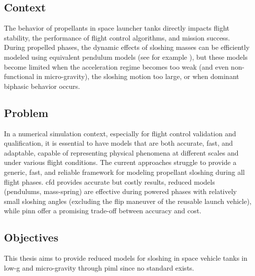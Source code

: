 \documentclass[12pt]{article}
\begin{document}
	\subsection*{Context}
	
	The behavior of propellants in space launcher tanks directly impacts flight stability, the performance of flight control algorithms, and mission success. During propelled phases, the dynamic effects of sloshing masses can be efficiently modeled using equivalent pendulum models (see for example \cite{ibrahimLiquidSloshingDynamics2005a}), but these models become limited when the acceleration regime becomes too weak (and even non-functional in micro-gravity), the sloshing motion too large, or when dominant biphasic behavior occurs.
	
	\subsection*{Problem}
	
	In a numerical simulation context, especially for flight control validation and qualification, it is essential to have models that are both accurate, fast, and adaptable, capable of representing physical phenomena at different scales and under various flight conditions.
	The current approaches struggle to provide a generic, fast, and reliable framework for modeling propellant sloshing during all flight phases. \acrshort{cfd} provides accurate but costly results, reduced models (pendulums, mass-spring) are effective during powered phases with relatively small sloshing angles (excluding the flip maneuver of the reusable launch vehicle), while \gls{pinn} offer a promising trade-off between accuracy and cost.
	
	\subsection*{Objectives}
	
	This thesis aims to provide reduced models for sloshing in space vehicle tanks in low-g and micro-gravity through \acrshort{piml} since no standard exists.
	
\end{document}
